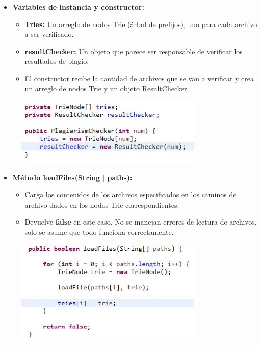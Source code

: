 \documentclass{article}
\begin{document}
	\begin{itemize}
	\item \textbf{Variables de instancia y constructor:}
	 \begin{itemize}
	 \item \textbf{Tries:} Un arreglo de nodos Trie (árbol de prefijos), uno para cada archivo a ser verificado.
	 \item \textbf{resultChecker:} Un objeto que parece ser responsable de verificar los resultados de plagio.
	 \item El constructor recibe la cantidad de archivos que se van a verificar y crea un arreglo de nodos Trie y un objeto ResultChecker.
	 \end{itemize}
	\end{itemize}
	 \begin{figure}[H]
		\centering
		\includegraphics[width=0.8\textwidth,keepaspectratio]{img/PC1.jpg}
	\end{figure}
	
	\begin{itemize}
	\item \textbf{Método loadFiles(String[] paths):}
	 \begin{itemize}
	 \item Carga los contenidos de los archivos especificados en los caminos de archivo dados en los nodos Trie correspondientes.
	 \item Devuelve \textbf{false} en este caso. No se manejan errores de lectura de archivos, solo se asume que todo funciona correctamente.
	 \end{itemize}
	\end{itemize}
	 \begin{figure}[H]
		\centering
		\includegraphics[width=0.8\textwidth,keepaspectratio]{img/PC2.jpg}
	\end{figure}
\clearpage		
	
\end{document}

